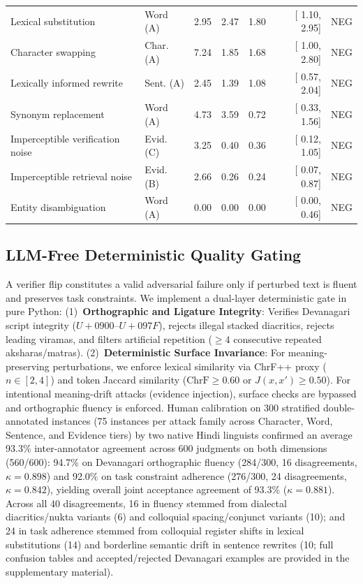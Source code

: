 \documentclass[11pt]{article}
\begin{document}
\begin{table}[!t]
{\begin{tabular}{llrrrrl}
Lexical substitution & Word (A) & 2.95 & 2.47 & 1.80 & [ 1.10,  2.95] & NEG \\
Character swapping & Char. (A) & 7.24 & 1.85 & 1.68 & [ 1.00,  2.80] & NEG \\
Lexically informed rewrite & Sent. (A) & 2.45 & 1.39 & 1.08 & [ 0.57,  2.04] & NEG \\
Synonym replacement & Word (A) & 4.73 & 3.59 & 0.72 & [ 0.33,  1.56] & NEG \\
Imperceptible verification noise & Evid. (C) & 3.25 & 0.40 & 0.36 & [ 0.12,  1.05] & NEG \\
Imperceptible retrieval noise & Evid. (B) & 2.66 & 0.26 & 0.24 & [ 0.07,  0.87] & NEG \\
Entity disambiguation & Word (A) & 0.00 & 0.00 & 0.00 & [ 0.00,  0.46] & NEG \\
\bottomrule
\end{tabular}%
}
\endgroup
\end{table}

\subsection{LLM-Free Deterministic Quality Gating}
A verifier flip constitutes a valid adversarial failure only if perturbed text is fluent and preserves task constraints. We implement a dual-layer deterministic gate in pure Python: (1)~\textbf{Orthographic and Ligature Integrity}: Verifies Devanagari script integrity ($U{+}0900$--$U{+}097F$), rejects illegal stacked diacritics, rejects leading viramas, and filters artificial repetition ($\ge 4$ consecutive repeated aksharas/matras). (2)~\textbf{Deterministic Surface Invariance}: For meaning-preserving perturbations, we enforce lexical similarity via ChrF++ proxy ($n \in [2, 4]$) and token Jaccard similarity ($\text{ChrF} \ge 0.60$ or $J(x, x') \ge 0.50$). For intentional meaning-drift attacks (evidence injection), surface checks are bypassed and orthographic fluency is enforced. Human calibration on 300 stratified double-annotated instances (75 instances per attack family across Character, Word, Sentence, and Evidence tiers) by two native Hindi linguists confirmed an average 93.3\% inter-annotator agreement across 600 judgments on both dimensions (560/600): 94.7\% on Devanagari orthographic fluency (284/300, 16 disagreements, $\kappa = 0.898$) and 92.0\% on task constraint adherence (276/300, 24 disagreements, $\kappa = 0.842$), yielding overall joint acceptance agreement of 93.3\% ($\kappa = 0.881$). Across all 40 disagreements, 16 in fluency stemmed from dialectal diacritics/nukta variants (6) and colloquial spacing/conjunct variants (10); and 24 in task adherence stemmed from colloquial register shifts in lexical substitutions (14) and borderline semantic drift in sentence rewrites (10; full confusion tables and accepted/rejected Devanagari examples are provided in the supplementary material).
\end{document}
